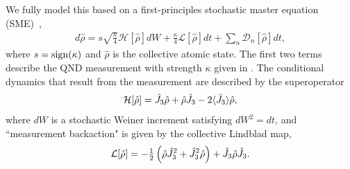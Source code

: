\documentclass[preprint,aps,pra,onecolumn]{revtex4-1} %
\newcommand{\jz}{\hat{J}_3}
\begin{document}
We fully model this based on a first-principles stochastic master equation (SME)~\cite{?},
	\begin{align} \label{Eq::SME}
		d \hat{\rho} = s\sqrt{\frac{\kappa}{4}} \mathcal{H}[\hat{\rho}] dW + \frac{\kappa}{4} \mathcal{L}[\hat{\rho}] dt + \sum_n \mathcal{D}_n [\hat{\rho}] dt,
	\end{align}
where $s = {\rm sign}(\kappa)$ and $\hat{\rho}$ is the collective atomic state. 
The first two terms describe the QND measurement with strength $\kappa$ given in . The conditional dynamics that result from the measurement are described by the superoperator
	\begin{align}
		\mathcal{H}[\hat{\rho}] = \jz \hat{\rho} + \hat{\rho} \jz - 2 \expt{\jz} \hat{\rho},
	\end{align}
where $dW$ is a stochastic Weiner increment satisfying $dW^2 = dt$, and ``measurement backaction" is given by the collective Lindblad map, 
	\begin{align}
		\mathcal{L}[\hat{\rho}] = - \smallfrac{1}{2}  \left(\hat{\rho}  \jz^2 + \jz^2 \hat{\rho}\right) + \jz \hat{\rho} \jz.
	\end{align}
\end{document}
